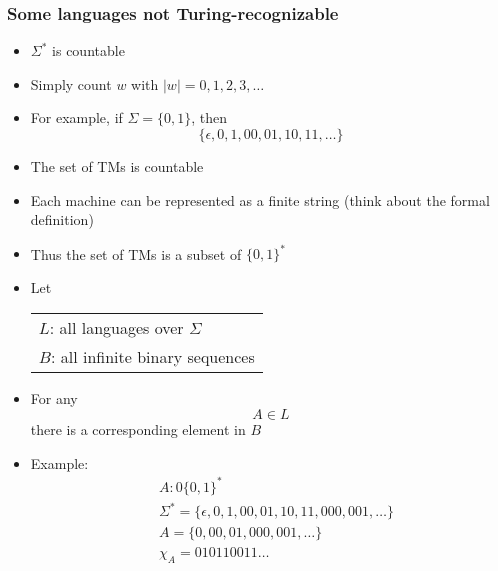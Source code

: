 




\begin{frame}[allowframebreaks] \frametitle{Some languages not Turing-recognizable}
    \begin{itemize}
\item $\Sigma^*$ is countable

\item [] Simply count $w$ with $|w|=0, 1,2,3,\ldots$
\item For example, if $\Sigma = \{0, 1\}$, then
  \begin{equation*}
    \{ \epsilon, 0, 1, 00, 01, 10, 11, \ldots \}
  \end{equation*}
\item The set of TMs is countable

\item Each machine can be represented as a finite string
  (think about the formal definition)

\item Thus the set of TMs is a subset of $\{0,1\}^*$

\item Let
  \begin{center}
    \begin{tabular}{l}
 $L$: all languages over $\Sigma$ \\
 $B$: all infinite binary sequences
    \end{tabular}
\end{center}
\item For any
  \begin{equation*}
  A\in L
\end{equation*}
there is a corresponding element in $B$
\item Example:
\begin{equation*}
\begin{split}
& A: 0 \{0,1\}^*\\
& \Sigma^*=\{\epsilon,0,1,00,01,10,11,000,001,\ldots\}\\
& A=\{0, 00, 01, 000, 001, \ldots\}\\
& \chi_A= 0 1 0 11 00 11 \ldots
\end{split}
\end{equation*}


\end{itemize}
\end{frame}
